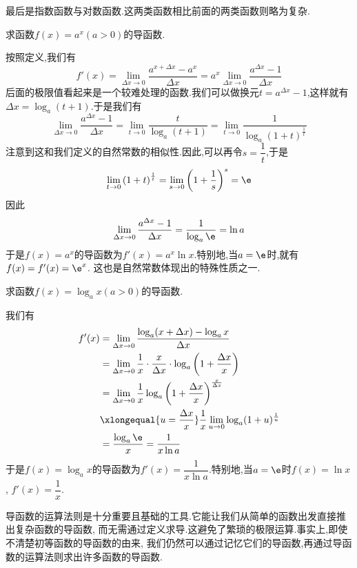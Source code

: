 \documentclass{ctexart}
\begin{document}
最后是指数函数与对数函数.这两类函数相比前面的两类函数则略为复杂.
\begin{problem}[P.0A.8]
    求函数$f(x)=a^x(a>0)$的导函数.
\end{problem}
\begin{derivation}
    按照定义,我们有
    \[f'(x)=\lim_{\Delta x\to0}\dfrac{a^{x+\Delta x}-a^x}{\Delta x}=a^x\lim_{\Delta x\to0}\dfrac{a^{\Delta x}-1}{\Delta x}\]
    后面的极限值看起来是一个较难处理的函数.我们可以做换元$t=a^{\Delta x}-1$,这样就有$\Delta x=\log_a(t+1)$.于是我们有
    \[\lim_{\Delta x\to0}\dfrac{a^{\Delta x}-1}{\Delta x}=\lim_{t\to0}\dfrac{t}{\log_a(t+1)}
    =\lim_{t\to0}\dfrac{1}{\log_a\left(1+t\right)^{\frac1t}}\]
    注意到这和我们定义的自然常数的相似性.因此,可以再令$s=\dfrac1t$,于是
    \[\lim_{t\to0}\left(1+t\right)^{\frac1t}=\lim_{s\to0}\left(1+\dfrac1s\right)^s=\e\]
    因此
    \[\lim_{\Delta x\to0}\dfrac{a^{\Delta x}-1}{\Delta x}=\dfrac{1}{\log_a\e}=\ln a\]
    于是$f(x)=a^x$的导函数为$f'(x)=a^x\ln x$.特别地,当$a=\e$时,就有$f(x)=f'(x)=\e^x$.%
    这也是自然常数体现出的特殊性质之一.
\end{derivation}
\begin{problem}[P.0A.9]
    求函数$f(x)=\log_ax(a>0)$的导函数.
\end{problem}
\begin{derivation}
    我们有
    \[\begin{aligned}
        f'(x)
        &= \lim_{\Delta x\to0}\dfrac{\log_a(x+\Delta x)-\log_a x}{\Delta x} \\
        &= \lim_{\Delta x\to0}\dfrac1x\cdot\dfrac{x}{\Delta x}\cdot\log_a\left(1+\dfrac{\Delta x}{x}\right) \\
        &= \lim_{\Delta x\to0}\dfrac1x\log_a\left(1+\dfrac{\Delta x}{x}\right)^{\frac{x}{\Delta x}} \\
        &\xlongequal{u=\frac{\Delta x}{x}} \dfrac1x\lim_{u\to0}\log_a(1+u)^{\frac1u} \\
        &= \dfrac{\log_a\e}{x} = \dfrac{1}{x\ln a}
    \end{aligned}\]
    于是$f(x)=\log_a x$的导函数为$f'(x)=\dfrac{1}{x\ln a}$.特别地,当$a=\e$时$f(x)=\ln x$,%
    $f'(x)=\dfrac1x$.
\end{derivation}
\indent 导函数的运算法则是十分重要且基础的工具.它能让我们从简单的函数出发直接推出复杂函数的导函数,%
而无需通过定义求导.这避免了繁琐的极限运算.事实上,即使不清楚初等函数的导函数的由来,%
我们仍然可以通过记忆它们的导函数,再通过导函数的运算法则求出许多函数的导函数.
\end{document}
